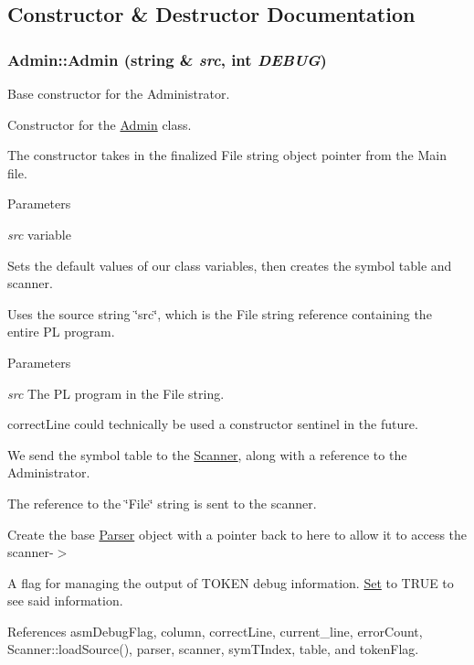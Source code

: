 \subsection{Constructor \& Destructor Documentation}
\hypertarget{classAdmin_a1483f37673aa04863e86a37b8c493733}{
\subsubsection[{Admin}]{\setlength{\rightskip}{0pt plus 5cm}Admin::Admin (string \& {\em src}, \/  int {\em DEBUG})}}
\label{classAdmin_a1483f37673aa04863e86a37b8c493733}


Base constructor for the Administrator. 

Constructor for the \hyperlink{classAdmin}{Admin} class.

The constructor takes in the finalized File string object pointer from the Main file. 
\begin{DoxyParams}{Parameters}
\item[{\em src}]variable\end{DoxyParams}
Sets the default values of our class variables, then creates the symbol table and scanner.

Uses the source string \char`\"{}src\char`\"{}, which is the File string reference containing the entire PL program.


\begin{DoxyParams}{Parameters}
\item[{\em src}]The PL program in the File string. \end{DoxyParams}


correctLine could technically be used a constructor sentinel in the future.

We send the symbol table to the \hyperlink{classScanner}{Scanner}, along with a reference to the Administrator.

The reference to the \char`\"{}File\char`\"{} string is sent to the scanner.

Create the base \hyperlink{classParser}{Parser} object with a pointer back to here to allow it to access the scanner-\/$>$

A flag for managing the output of TOKEN debug information. \hyperlink{classSet}{Set} to TRUE to see said information. 



References asmDebugFlag, column, correctLine, current\_\-line, errorCount, Scanner::loadSource(), parser, scanner, symTIndex, table, and tokenFlag.



